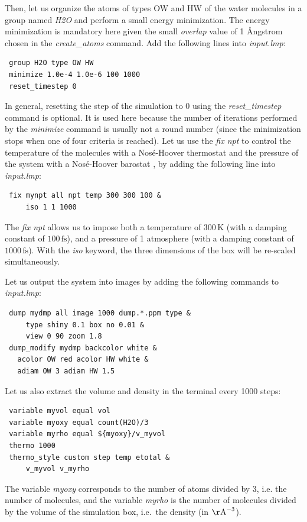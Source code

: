 \documentclass[9pt,tutorial]{livecoms}
\begin{document}
Then, let us organize the atoms of types OW and HW of the water molecules in a
group named \textit{H2O} and perform a small energy minimization. The energy
minimization is mandatory here given the small \textit{overlap} value of 1 Ångstrom
chosen in the \textit{create\_atoms} command. Add the following lines into \textit{input.lmp}:
{\normalsize \begin{verbatim}
 group H2O type OW HW
 minimize 1.0e-4 1.0e-6 100 1000
 reset_timestep 0
\end{verbatim}}
In general, resetting the step of the simulation to 0 using the
\textit{reset\_timestep} command is optional.
It is used here because the number of iterations performed by the \textit{minimize}
command is usually not a round number (since the minimization stops when one of
four criteria is reached). Let us use the \textit{fix npt} to control the temperature
of the molecules with a Nosé-Hoover thermostat and the pressure of the system with
a Nosé-Hoover barostat \cite{nose1984unified, hoover1985canonical, martyna1994constant},
by adding the following line into \textit{input.lmp}:
{\normalsize \begin{verbatim}
 fix mynpt all npt temp 300 300 100 &
     iso 1 1 1000
\end{verbatim}}
The \textit{fix npt} allows us to impose both a temperature of $300\,\text{K}$
(with a damping constant of $100\,\text{fs}$), and a pressure of 1 atmosphere
(with a damping constant of $1000\,\text{fs}$). With the \textit{iso} keyword,
the three dimensions of the box will be re-scaled simultaneously.

Let us output the system into images by adding the following commands to \textit{input.lmp}:
{\normalsize \begin{verbatim}
 dump mydmp all image 1000 dump.*.ppm type &
     type shiny 0.1 box no 0.01 &
     view 0 90 zoom 1.8
 dump_modify mydmp backcolor white &
   acolor OW red acolor HW white &
   adiam OW 3 adiam HW 1.5
\end{verbatim}}
Let us also extract the volume and density in the terminal every 1000 steps:
{\normalsize \begin{verbatim}
 variable myvol equal vol
 variable myoxy equal count(H2O)/3
 variable myrho equal ${myoxy}/v_myvol
 thermo 1000
 thermo_style custom step temp etotal &
     v_myvol v_myrho
\end{verbatim}}
The variable \textit{myoxy} corresponds to the number of atoms divided by 3, i.e.
the number of molecules, and the variable \textit{myrho} is the number of molecules
divided by the volume of the simulation box, i.e.~the density (in $\mathrm{\AA{}}^{-3}$).
\end{document}
